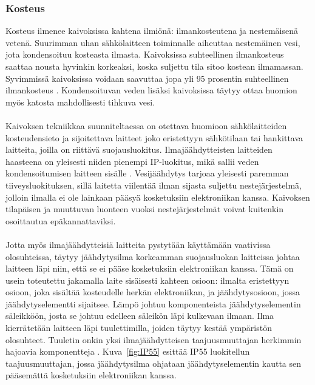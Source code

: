 \documentclass[finnish,12pt,a4paper,pdftex,elec,utf8]{aaltothesis}
\begin{document}
\subsubsection{Kosteus}
Kosteus ilmenee kaivoksissa kahtena ilmiönä: ilmankosteutena ja nestemäisenä vetenä. Suurimman uhan sähkölaitteen toiminnalle aiheuttaa nestemäinen vesi, jota kondensoituu kosteasta ilmasta. Kaivoksissa suhteellinen ilmankosteus saattaa nousta hyvinkin korkeaksi, koska suljettu tila sitoo kostean ilmamassan.  Syvimmissä kaivoksissa voidaan saavuttaa jopa yli 95 prosentin suhteellinen ilmankosteus \cite{manchao}. Kondensoituvan veden lisäksi kaivoksissa täytyy ottaa huomion myös katosta mahdollisesti tihkuva vesi.
\\\\
Kaivoksen tekniikkaa suunniteltaessa on otettava huomioon sähkölaitteiden kosteudensieto ja sijoitettava laitteet joko eristettyyn sähkötilaan tai hankittava laitteita, joilla on riittävä suojausluokitus. Ilmajäähdytteisten laitteiden haasteena on yleisesti niiden pienempi IP-luokitus, mikä sallii veden kondensoitumisen laitteen sisälle \cite{Pallasmaa}. Vesijäähdytys tarjoaa yleisesti paremman tiiveysluokituksen, sillä laitetta viilentää ilman sijasta suljettu nestejärjestelmä, jolloin ilmalla ei ole lainkaan pääsyä kosketuksiin elektroniikan kanssa. Kaivoksen tilapäisen ja muuttuvan luonteen vuoksi nestejärjestelmät voivat kuitenkin osoittautua epäkannattaviksi.
\\\\
Jotta myös ilmajäähdytteisiä laitteita pystytään käyttämään vaativissa olosuhteissa, täytyy jäähdytysilma korkeamman suojausluokan laitteissa johtaa laitteen läpi niin, että se ei pääse kosketuksiin elektroniikan kanssa. Tämä on usein toteutettu jakamalla laite sisäisesti kahteen osioon: ilmalta eristettyyn osioon, joka sisältää kosteudelle herkän elektroniikan, ja jäähdytysosioon, jossa jäähdytyselementti  sijaitsee.  Lämpö johtuu komponenteista jäähdytyselementin säleikköön, josta se johtuu edelleen säleikön läpi kulkevaan ilmaan. Ilma kierrätetään laitteen läpi tuulettimilla, joiden täytyy kestää ympäristön olosuhteet. Tuuletin onkin yksi ilmajäähdytteisen taajuusmuuttajan herkimmin hajoavia komponentteja \cite{Muttilainen}. Kuva~\ref{fig:IP55} esittää IP55 luokitellun taajuusmuuttajan, jossa jäähdytysilma ohjataan jäähdytyselementin kautta sen pääsemättä kosketuksiin elektroniikan kanssa.
\end{document}
